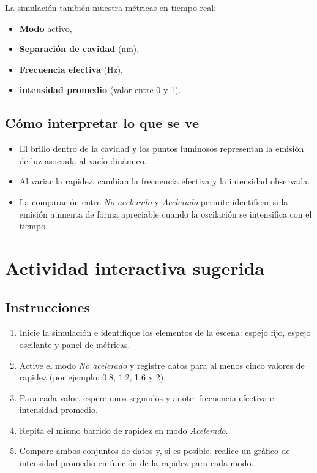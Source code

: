 \documentclass{aa}
\begin{document}
La simulación también muestra métricas en tiempo real:

\begin{itemize}
  \item \textbf{Modo} activo,
  \item \textbf{Separación de cavidad} (nm),
  \item \textbf{Frecuencia efectiva} (Hz),
  \item \textbf{intensidad promedio} (valor entre 0 y 1).
\end{itemize}

\subsection{Cómo interpretar lo que se ve}

\begin{itemize}
  \item El brillo dentro de la cavidad y los puntos luminosos representan la emisión de luz asociada al vacío dinámico.
  \item Al variar la rapidez, cambian la frecuencia efectiva y la intensidad observada.
  \item La comparación entre \emph{No acelerado} y \emph{Acelerado} permite identificar si la emisión aumenta de forma apreciable cuando la oscilación se intensifica con el tiempo.
\end{itemize}

\section{Actividad interactiva sugerida}

\subsection{Instrucciones}

\begin{enumerate}
  \item Inicie la simulación e identifique los elementos de la escena: espejo fijo, espejo oscilante y panel de métricas.
  \item Active el modo \emph{No acelerado} y registre datos para al menos cinco valores de rapidez (por ejemplo: 0.8, 1.2, 1.6 y 2).
  \item Para cada valor, espere unos segundos y anote: frecuencia efectiva e intensidad promedio.
  \item Repita el mismo barrido de rapidez en modo \emph{Acelerado}.
  \item Compare ambos conjuntos de datos y, si es posible, realice un gráfico de intensidad promedio en función de la rapidez para cada modo.
\end{enumerate}
\end{document}
